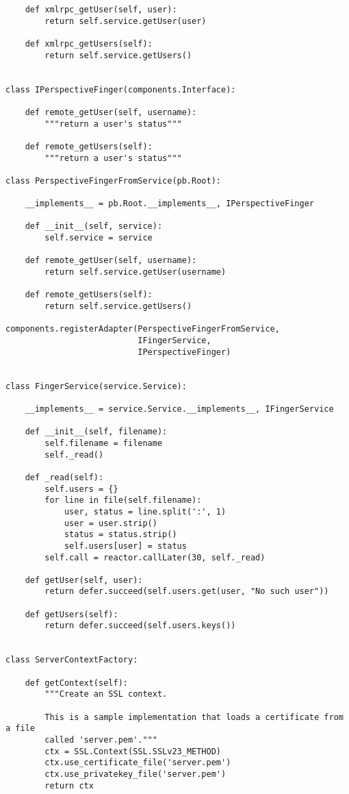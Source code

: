 \begin{verbatim}
    def xmlrpc_getUser(self, user):
        return self.service.getUser(user)

    def xmlrpc_getUsers(self):
        return self.service.getUsers()


class IPerspectiveFinger(components.Interface):

    def remote_getUser(self, username):
        """return a user's status"""

    def remote_getUsers(self):
        """return a user's status"""

class PerspectiveFingerFromService(pb.Root):

    __implements__ = pb.Root.__implements__, IPerspectiveFinger

    def __init__(self, service):
        self.service = service

    def remote_getUser(self, username):
        return self.service.getUser(username)

    def remote_getUsers(self):
        return self.service.getUsers()

components.registerAdapter(PerspectiveFingerFromService,
                           IFingerService,
                           IPerspectiveFinger)


class FingerService(service.Service):

    __implements__ = service.Service.__implements__, IFingerService

    def __init__(self, filename):
        self.filename = filename
        self._read()

    def _read(self):
        self.users = {}
        for line in file(self.filename):
            user, status = line.split(':', 1)
            user = user.strip()
            status = status.strip()
            self.users[user] = status
        self.call = reactor.callLater(30, self._read)

    def getUser(self, user):
        return defer.succeed(self.users.get(user, "No such user"))

    def getUsers(self):
        return defer.succeed(self.users.keys())


class ServerContextFactory:

    def getContext(self):
        """Create an SSL context.

        This is a sample implementation that loads a certificate from a file
        called 'server.pem'."""
        ctx = SSL.Context(SSL.SSLv23_METHOD)
        ctx.use_certificate_file('server.pem')
        ctx.use_privatekey_file('server.pem')
        return ctx





\end{verbatim}
